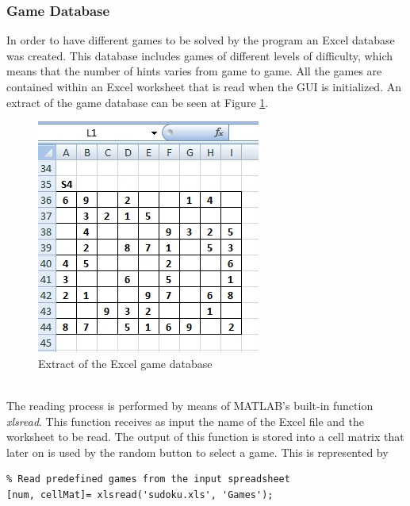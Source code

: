 \documentclass[12pt,a4paper]{article} %
\begin{document}
\subsubsection{Game Database}
In order to have different games to be solved by the program an Excel database was created. This database includes games of different levels of difficulty, which means that the number of hints varies from game to game. All the games are contained within an Excel worksheet that is read when the GUI is initialized. An extract of the game database can be seen at Figure \ref{fig:excel}.
\begin{figure}[h!]
\centering
\includegraphics[scale = 0.6]{pictures/Excel1}
\caption{Extract of the Excel game database}
\label{fig:excel}
\end{figure}
\newline
\\The reading process is performed by means of MATLAB’s built-in function \textit{xlsread}. This function receives as input the name of the Excel file and the worksheet to be read. The output of this function is stored into a cell matrix that later on is used by the random button to select a game. This is represented by
\begin{verbatim}
% Read predefined games from the input spreadsheet
[num, cellMat]= xlsread('sudoku.xls', 'Games');
\end{verbatim}
\end{document}
